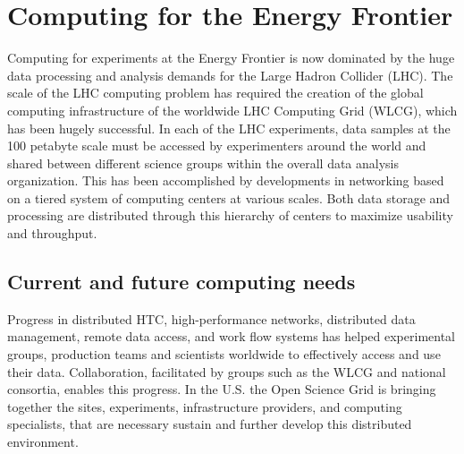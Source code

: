 \section{Computing for the Energy Frontier}

Computing for experiments at the Energy Frontier is now dominated by
the huge data processing and analysis demands for the Large Hadron Collider
(LHC). The scale of the LHC computing problem has required the creation of the
global computing infrastructure of the 
worldwide LHC Computing Grid (WLCG), which has been
hugely successful.  
In each of the LHC experiments, 
data samples at the 100 petabyte scale must be accessed by experimenters around 
the world and shared between different science groups within the overall 
data analysis organization.  This has been accomplished by developments 
in networking based on a tiered system of computing centers at various 
scales. Both data storage and processing are distributed through 
this hierarchy of centers to maximize usability and throughput.

\subsection{Current and future computing needs}
Progress in distributed HTC, high-performance networks, distributed data 
management, remote data access, and work flow systems has helped 
experimental groups, production teams and scientists worldwide to
effectively access 
and use their data. Collaboration, facilitated by groups such as 
the WLCG and national consortia, enables this progress.
In the U.S.  the Open Science Grid is  bringing together the sites, 
experiments, infrastructure
providers, and computing specialists, that are necessary sustain and
further develop this distributed environment.

